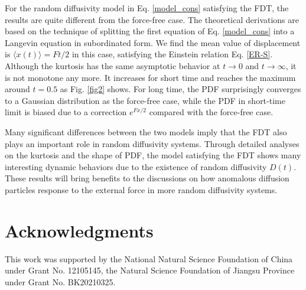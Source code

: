 \documentclass[aps,pre,twocolumn,groupedaddress,longbibliography]{revtex4-2}
\begin{document}
For the random diffusivity model in Eq. \eqref{model_cons} satisfying the FDT, the results are quite different from the force-free case. The theoretical derivations are based on the technique of splitting the first equation of Eq. \eqref{model_cons} into a Langevin equation in subordinated form. We find the mean value of displacement is $\langle x(t)\rangle=Ft/2$ in this case, satisfying the Einstein relation Eq. \eqref{ER-S}. Although the kurtosis has the same asymptotic behavior at $t\rightarrow0$ and $t\rightarrow\infty$, it is not monotone any more. It increases for short time and reaches the maximum around $t=0.5$ as Fig. \ref{fig2} shows.
For long time, the PDF surprisingly converges to a Gaussian distribution as the force-free case, while the PDF in short-time limit is biased due to a correction $e^{Fx/2}$ compared with the force-free case.

Many significant differences between the two models imply that the FDT also plays an important role in random diffusivity systems. Through detailed analyses on the kurtosis and the shape of PDF, the model satisfying the FDT shows many interesting dynamic behaviors due to the existence of random diffusivity $D(t)$. These results will bring benefits to the discussions on how anomalous diffusion particles response to the external force in more random diffusivity systems.



\section*{Acknowledgments}
This work was supported by the National Natural Science
Foundation of China under Grant No. 12105145, the Natural Science Foundation of Jiangsu Province under Grant No. BK20210325.

\appendix
\end{document}
